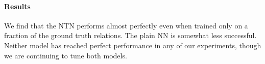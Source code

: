 \paragraph{Results} 
We find that the NTN performs almost perfectly even when trained only
on a fraction of the ground truth relations. The plain NN is somewhat less
successful. Neither model has reached perfect performance in any of
our experiments, though we are continuing to tune both models.

\begin{table}[h]
\centering{}
 \caption{Test (train) accuracy figures on the WordNet data. The baseline figure is simply the frequency of the most frequent class, .\label{b-table}}  
\end{table}


